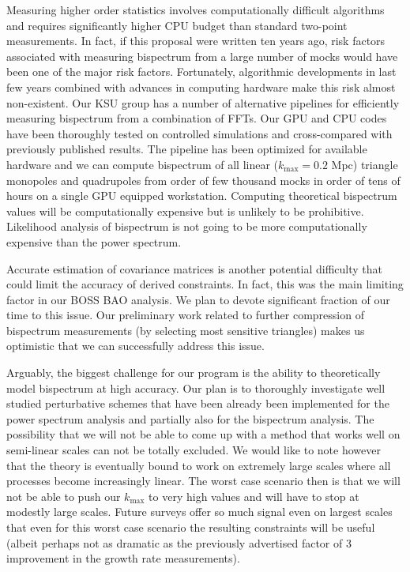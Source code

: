 Measuring higher order statistics involves computationally difficult algorithms
and requires significantly higher CPU budget than standard two-point
measurements.  In fact, if this proposal were written ten years ago, risk
factors associated with measuring bispectrum from a large number of mocks would
have been one of the major risk factors. Fortunately, algorithmic developments
in last few years combined with advances in computing hardware make this risk
almost non-existent. Our KSU group has a number of alternative pipelines for
efficiently measuring bispectrum from a combination of FFTs. Our GPU and CPU
codes have been thoroughly tested on controlled simulations and cross-compared
with previously published results. The pipeline has been optimized for
available hardware and we can compute bispectrum of all linear ($k_\mathrm{max}
= 0.2$ Mpc) triangle monopoles and quadrupoles from order of few thousand mocks
in order of tens of hours on a single GPU equipped workstation. Computing
theoretical bispectrum values will be computationally expensive but is unlikely
to be prohibitive. Likelihood analysis of bispectrum is not going to be more
computationally expensive than the power spectrum.

Accurate estimation of covariance matrices is another potential difficulty that
could limit the accuracy of derived constraints. In fact, this was the main
limiting factor in our BOSS BAO analysis. We plan to devote significant
fraction of our time to this issue. Our preliminary work related to further
compression of bispectrum measurements (by selecting most sensitive triangles)
makes us optimistic that we can successfully address this issue.

Arguably, the biggest challenge for our program is the ability to theoretically
model bispectrum at high accuracy. Our plan is to thoroughly investigate well
studied perturbative schemes that have been already been implemented for the
power spectrum analysis and partially also for the bispectrum analysis. The
possibility that we will not be able to come up with a method that works well
on semi-linear scales can not be totally excluded. We would like to note
however that the theory is eventually bound to work on extremely large scales
where all processes become increasingly linear. The worst case scenario then is
that we will not be able to push our $k_\mathrm{max}$ to very high values and
will have to stop at modestly large scales. Future surveys offer so much
signal even on largest scales that even for this worst case scenario the
resulting constraints will be useful (albeit perhaps not as dramatic as the
previously advertised factor of 3 improvement in the growth rate measurements).

